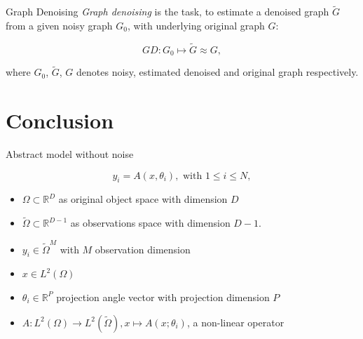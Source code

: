 \documentclass[aspectratio=169]{beamer}
\begin{document}
%
%

\begin{frame}[c]{Graph Denoising}
    \textit{Graph denoising} is the task, to estimate a denoised graph $\tilde{G}$  
    from a given noisy graph $G_0$, with underlying original graph $G$:

    \begin{definition}
        $$GD: G_0 \mapsto \tilde{G} \approx G,$$
    \end{definition}
    where $G_0$, $\tilde{G}$, $G$ denotes noisy, estimated denoised and original graph respectively.
   

\end{frame}

\section{Conclusion}

\begin{frame}[c]{Abstract model without noise}
    \begin{definition}
        $$y_i = A(x, \theta_i), \text{ with } 1 \leq i \leq N ,$$
    \end{definition}

    \begin{itemize}
        \item $\Omega \subset \mathbb{R}^D$ as original object space with dimension $D$
        \item $\tilde{\Omega} \subset \mathbb{R}^{D-1}$ as observations space with dimension $D-1$.
        \item $y_i \in \tilde{\Omega}^M$ with $M$ observation dimension
        \item $x \in L^2(\Omega)$
        \item $\theta_i \in \mathbb{R}^P$ projection angle vector with projection dimension $P$
        \item $A: L^2(\Omega) \to L^2(\tilde{\Omega}), x \mapsto A(x; \theta_i)$, a non-linear operator  
    \end{itemize}

\end{frame}
\end{document}
